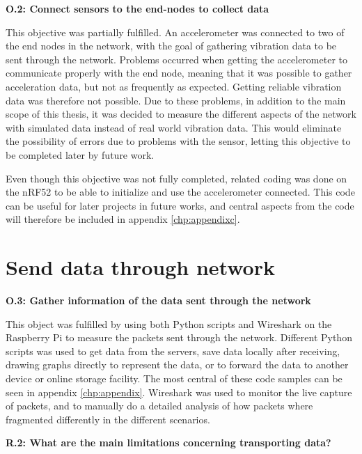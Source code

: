 \noindent\textbf{O.2: Connect sensors to the end-nodes to collect data}

\noindent This objective was partially fulfilled. An accelerometer was connected to two of the end nodes in the network, with the goal of gathering vibration data to be sent through the network. Problems occurred when getting the accelerometer to communicate properly with the end node, meaning that it was possible to gather acceleration data, but not as frequently as expected. Getting reliable vibration data was therefore not possible. Due to these problems, in addition to the main scope of this thesis, it was decided to measure the different aspects of the network with simulated data instead of real world vibration data. This would eliminate the possibility of errors due to problems with the sensor, letting this objective to be completed later by future work. 

\noindent Even though this objective was not fully completed, related coding was done on the \gls{nRF52} to be able to initialize and use the accelerometer connected. This code can be useful for later projects in future works, and central aspects from the code will therefore be included in appendix \ref{chp:appendixc}.  



\section{Send data through network}

\noindent\textbf{O.3: Gather information of the data sent through the network}

\noindent This object was fulfilled by using both Python scripts and Wireshark on the \gls{Raspberry Pi} to measure the packets sent through the network. Different Python scripts was used to get data from the servers, save data locally after receiving, drawing graphs directly to represent the data, or to forward the data to another device or online storage facility. The most central of these code samples can be seen in appendix \ref{chp:appendix}. Wireshark was used to monitor the live capture of packets, and to manually do a detailed analysis of how packets where fragmented differently in the different scenarios. 

\noindent\textbf{R.2: What are the main limitations concerning transporting data?}

